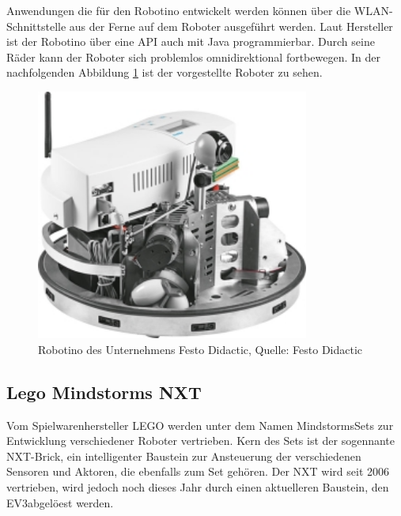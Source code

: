 Anwendungen die f\"ur den Robotino entwickelt werden k\"onnen \"uber die WLAN-Schnittstelle aus der Ferne auf dem Roboter ausgef\"uhrt werden. Laut Hersteller ist der Robotino \"uber eine \gls{API} auch mit Java programmierbar. Durch seine  R\"ader kann der Roboter sich problemlos omnidirektional fortbewegen. In der nachfolgenden Abbildung \ref{fig:robotino} ist der vorgestellte Roboter zu sehen.

\begin{figure}[H]
\includegraphics[width=0.8\textwidth]{img/robotino/d750242uc.jpg}
\caption[Robotiono]{Robotino des Unternehmens Festo Didactic, Quelle: Festo Didactic\footnotemark[13]}
\label{fig:robotino}
\end{figure}

\newpage
\clearpage

\subsection{Lego Mindstorms NXT}

Vom Spielwarenhersteller LEGO werden unter dem Namen Mindstorms\footnotemark[14] Sets zur Entwicklung verschiedener Roboter vertrieben. Kern des Sets ist der sogennante NXT-Brick, ein intelligenter Baustein zur Ansteuerung der verschiedenen Sensoren und Aktoren, die ebenfalls zum Set geh\"oren. Der NXT wird seit 2006 vertrieben, wird jedoch noch dieses Jahr durch einen aktuelleren Baustein, den EV3\footnotemark[15] abgel\"oest werden.

